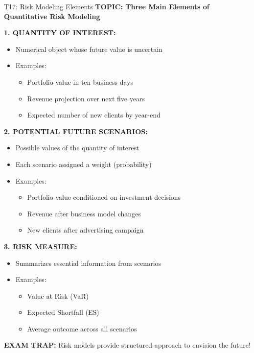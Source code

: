 \documentclass[8pt]{beamer}
\begin{document}
	\begin{frame}{T17: Risk Modeling Elements}
		\fontsize{6.5}{7.5}\selectfont
		\textbf{TOPIC: Three Main Elements of Quantitative Risk Modeling}
		
		\vspace{0.1cm}
		\textbf{1. QUANTITY OF INTEREST:}
		\begin{itemize}
			\item Numerical object whose future value is uncertain
			\item Examples:
			\begin{itemize}
				\item Portfolio value in ten business days
				\item Revenue projection over next five years
				\item Expected number of new clients by year-end
			\end{itemize}
		\end{itemize}
		
		\vspace{0.1cm}
		\textbf{2. POTENTIAL FUTURE SCENARIOS:}
		\begin{itemize}
			\item Possible values of the quantity of interest
			\item Each scenario assigned a weight (probability)
			\item Examples:
			\begin{itemize}
				\item Portfolio value conditioned on investment decisions
				\item Revenue after business model changes
				\item New clients after advertising campaign
			\end{itemize}
		\end{itemize}
		
		\vspace{0.1cm}
		\textbf{3. RISK MEASURE:}
		\begin{itemize}
			\item Summarizes essential information from scenarios
			\item Examples:
			\begin{itemize}
				\item Value at Risk (VaR)
				\item Expected Shortfall (ES)
				\item Average outcome across all scenarios
			\end{itemize}
		\end{itemize}
		
		\textcolor{myred}{\textbf{EXAM TRAP:}} Risk models provide \textcolor{myblue}{structured approach to envision the future}!
	\end{frame}
	
\end{document}

